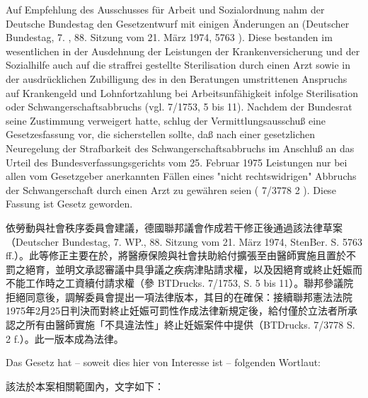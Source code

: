 \documentclass[12pt]{article}
\begin{document}
\begin{sourcepara}[title={原文理由 A.I.3 續}]
Auf Empfehlung des Ausschusses für Arbeit und Sozialordnung nahm der Deutsche Bundestag den Gesetzentwurf mit einigen Änderungen an (Deutscher Bundestag, 7. \abbrWP{}, 88. Sitzung vom 21. März 1974, \abbrStenBer{} \abbrS{} 5763 \abbrFF{}). Diese bestanden im wesentlichen in der Ausdehnung der Leistungen der Krankenversicherung und der Sozialhilfe auch auf die straffrei gestellte Sterilisation durch einen Arzt sowie in der ausdrücklichen Zubilligung des in den Beratungen umstrittenen Anspruchs auf Krankengeld und Lohnfortzahlung bei Arbeitsunfähigkeit infolge Sterilisation oder Schwangerschaftsabbruchs (vgl. \abbrBTDrucks{} 7/1753, \abbrS{} 5 bis 11). Nachdem der Bundesrat seine Zustimmung verweigert hatte, schlug der Vermittlungsausschuß eine Gesetzesfassung vor, die sicherstellen sollte, daß nach einer gesetzlichen Neuregelung der Strafbarkeit des Schwangerschaftsabbruchs im Anschluß an das Urteil des Bundesverfassungsgerichts vom 25. Februar 1975 Leistungen nur bei allen vom Gesetzgeber anerkannten Fällen eines "nicht rechtswidrigen" Abbruchs der Schwangerschaft durch einen Arzt zu gewähren seien (\abbrBTDrucks{} 7/3778 \abbrS{} 2 \abbrF{}). Diese Fassung ist Gesetz geworden.
\end{sourcepara}
\begin{transpara}
依勞動與社會秩序委員會建議，德國聯邦議會作成若干修正後通過該法律草案（Deutscher Bundestag, 7. WP., 88. Sitzung vom 21. März 1974, StenBer. S. 5763 ff.）。此等修正主要在於，將醫療保險與社會扶助給付擴張至由醫師實施且置於不罰之絕育，並明文承認審議中具爭議之疾病津貼請求權，以及因絕育或終止妊娠而不能工作時之工資續付請求權（參 BTDrucks. 7/1753, S. 5 bis 11）。聯邦參議院拒絕同意後，調解委員會提出一項法律版本，其目的在確保：接續聯邦憲法法院1975年2月25日判決而對終止妊娠可罰性作成法律新規定後，給付僅於立法者所承認之所有由醫師實施「不具違法性」終止妊娠案件中提供（BTDrucks. 7/3778 S. 2 f.）。此一版本成為法律。
\end{transpara}

\begin{sourcepara}[title={原文理由 A.I.3 續} Rn 23]
Das Gesetz hat -- soweit dies hier von Interesse ist -- folgenden Wortlaut:
\end{sourcepara}
\begin{transpara}
該法於本案相關範圍內，文字如下：
\end{transpara}
\end{document}
